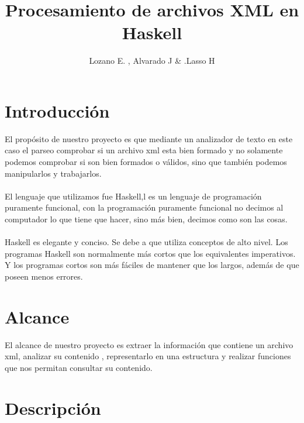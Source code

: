 \documentclass[11pt]{article} %
\title{Procesamiento de archivos  XML  en Haskell}
\author{Lozano E. , Alvarado J \& .Lasso H}
\begin{document}
\maketitle

\section{Introducción}
El propósito de nuestro proyecto es que  mediante un analizador de texto en este caso el parseo comprobar si un archivo xml esta bien formado   y no  solamente podemos comprobar si  son bien formados o válidos, sino que también podemos  manipularlos y trabajarlos.\\
\\El lenguaje  que utilizamos fue Haskell,l es un lenguaje de programación puramente funcional, con la programación puramente funcional no decimos al computador lo que tiene que hacer, sino más bien, decimos como son las cosas.\\ \\
Haskell es elegante y conciso. Se debe a que utiliza conceptos de alto nivel. Los programas Haskell son normalmente más cortos que los equivalentes imperativos. Y los programas cortos son más fáciles de mantener que los largos, además de que poseen menos errores.

\section{Alcance}
El alcance de nuestro proyecto es extraer la información que contiene un archivo xml, analizar su contenido , representarlo en una estructura y realizar funciones que nos permitan consultar su contenido.


\section{Descripción}
\end{document}

